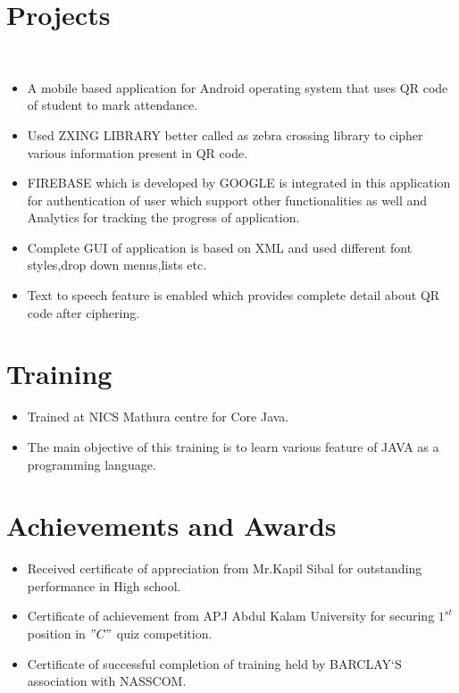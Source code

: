 \documentclass[]{deedy-resume-openfont}
\begin{document}
\hfill
\begin{minipage}[t]{0.66\textwidth} 

\section{Projects}

\\
\begin{itemize}
\setlength\itemsep{0.001em}
\item A mobile based application for Android operating system that uses QR code of student to mark attendance.
\item Used ZXING LIBRARY better called as zebra crossing library to cipher various information present in QR code.
\item FIREBASE which is developed by GOOGLE is integrated in this application for authentication of user which support other functionalities as well and Analytics for tracking the progress of application.
\item Complete GUI of application is based on XML and used different font styles,drop down menus,lists etc.
\item Text to speech feature is enabled which provides complete detail about QR code after ciphering.
\end{itemize}
\sectionsep

\section{Training}
\begin{itemize}
\setlength\itemsep{0.001em}
      \item Trained at NICS Mathura centre for Core Java. 
    \item The main objective of this training is to learn various feature of JAVA as a programming language.
\end{itemize}

\section{Achievements and Awards}
\begin{itemize}
 \setlength\itemsep{0.001em}
\item Received certificate of appreciation from Mr.Kapil Sibal for outstanding performance in High school.
\item Certificate of achievement from APJ Abdul Kalam University for securing $1^{st}$ position in $"C"$ quiz competition.
\item Certificate of successful completion of training held by BARCLAY`S association with NASSCOM.
\end{itemize}

\end{minipage}
\end{document}
